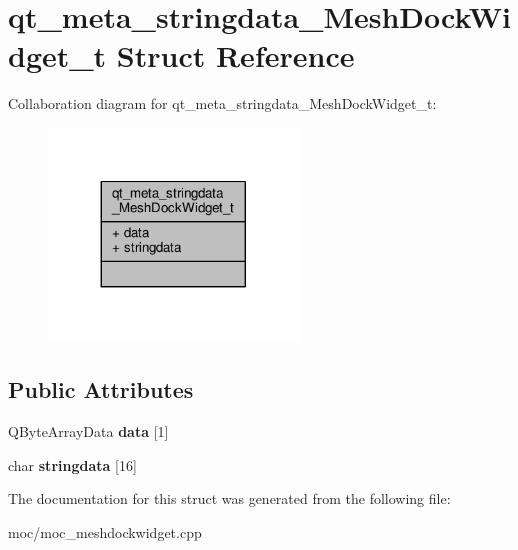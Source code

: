 \hypertarget{structqt__meta__stringdata___mesh_dock_widget__t}{\section{qt\-\_\-meta\-\_\-stringdata\-\_\-\-Mesh\-Dock\-Widget\-\_\-t Struct Reference}
\label{structqt__meta__stringdata___mesh_dock_widget__t}
}


Collaboration diagram for qt\-\_\-meta\-\_\-stringdata\-\_\-\-Mesh\-Dock\-Widget\-\_\-t\-:
\nopagebreak
\begin{figure}[H]
\begin{center}
\leavevmode
\includegraphics[width=188pt]{structqt__meta__stringdata___mesh_dock_widget__t__coll__graph}
\end{center}
\end{figure}
\subsection*{Public Attributes}
\begin{DoxyCompactItemize}
\item 
\hypertarget{structqt__meta__stringdata___mesh_dock_widget__t_a047fdb2cbe85c284a273b7a53fc47615}{Q\-Byte\-Array\-Data {\bfseries data} \mbox{[}1\mbox{]}}\label{structqt__meta__stringdata___mesh_dock_widget__t_a047fdb2cbe85c284a273b7a53fc47615}

\item 
\hypertarget{structqt__meta__stringdata___mesh_dock_widget__t_ad49bb9d289388e4f2e6860439215174f}{char {\bfseries stringdata} \mbox{[}16\mbox{]}}\label{structqt__meta__stringdata___mesh_dock_widget__t_ad49bb9d289388e4f2e6860439215174f}

\end{DoxyCompactItemize}


The documentation for this struct was generated from the following file\-:\begin{DoxyCompactItemize}
\item 
moc/moc\-\_\-meshdockwidget.\-cpp\end{DoxyCompactItemize}
